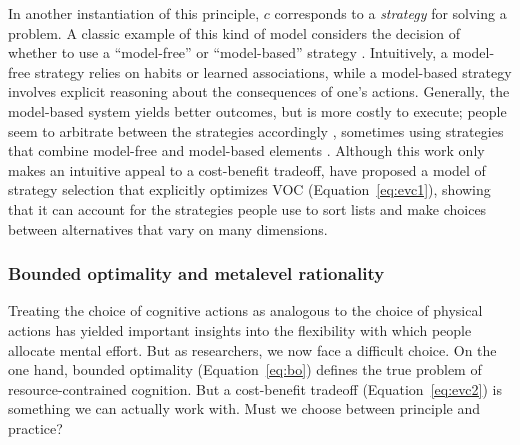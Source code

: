 
In another instantiation of this principle, $c$ corresponds to a \emph{strategy} for solving a problem. A classic example of this kind of model considers the decision of whether to use a ``model-free'' or ``model-based'' strategy \citep{daw2005uncertaintybased}. Intuitively, a model-free strategy relies on habits or learned associations, while a model-based strategy involves explicit reasoning about the consequences of one's actions. Generally, the model-based system yields better outcomes, but is more costly to execute; people seem to arbitrate between the strategies accordingly \citep{keramati2011speed,kool2017costbenefit}, sometimes using strategies that combine model-free and model-based elements \citep{keramati2016adaptive}. Although this work only makes an intuitive appeal to a cost-benefit tradeoff, \citet{lieder2017strategy} have proposed a model of strategy selection that explicitly optimizes VOC (Equation~\ref{eq:evc1}), showing that it can account for the strategies people use to sort lists and make choices between alternatives that vary on many dimensions.

\subsubsection{Bounded optimality and metalevel rationality}

Treating the choice of cognitive actions as analogous to the choice of physical actions has yielded important insights into the flexibility with which people allocate mental effort. But as researchers, we now face a difficult choice. On the one hand, bounded optimality (Equation~\ref{eq:bo}) defines the true problem of resource-contrained cognition. But a cost-benefit tradeoff (Equation~\ref{eq:evc2}) is something we can actually work with. Must we choose between principle and practice?

